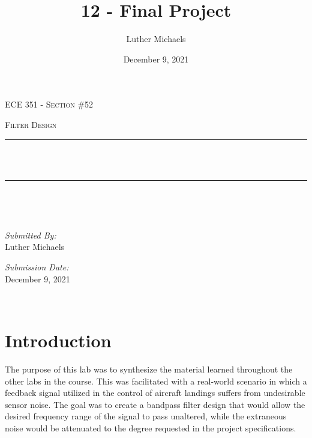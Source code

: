 \documentclass[12pt]{report}
\title{12 - Final Project}	%
\author{Luther Michaels}	%
\date{December 9, 2021}   %
\makeatletter
\let\thetitle\@title
\makeatother
\begin{document}
	
\begin{titlepage}
	\centering
	\vspace*{0.5 cm}
		
	\begin{center}    
		\textsc{\Large   ECE 351 - Section \#52}\\[2.0 cm]	
	\end{center}  
	\textsc{\Large Filter Design  }\\[0.5 cm]
	\rule{\linewidth}{0.2 mm} \\[0.4 cm]
	{ \huge \bfseries \thetitle}\\
	\rule{\linewidth}{0.2 mm} \\[1.5 cm]
	\begin{minipage}{0.4\textwidth}
		\begin{flushleft} \large
		\end{flushleft}
	\end{minipage}~
	\begin{minipage}{0.4\textwidth}
		\begin{flushright} \large
			\emph{Submitted By:} \\
			Luther Michaels \break
			
			\emph{Submission Date:} \\
			December 9, 2021
		\end{flushright}
	\end{minipage}\\[2 cm]
\end{titlepage}
	

\tableofcontents
\pagebreak

\renewcommand{\thesection}{\arabic{section}}
\section{Introduction}

The purpose of this lab was to synthesize the material learned throughout the other labs in the course. This was facilitated with a real-world scenario in which a feedback signal utilized in the control of aircraft landings suffers from undesirable sensor noise. The goal was to create a bandpass filter design that would allow the desired frequency range of the signal to pass unaltered, while the extraneous noise would be attenuated to the degree requested in the project specifications. \\
\end{document}
